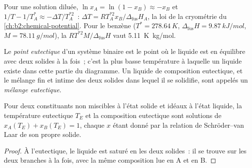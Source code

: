 Pour une solution diluée, $\ln x_A = \ln(1 - x_B) \approx -x_B$ et $1/T -
1/T_A^* \approx -\Delta T/T_A^{*2}$~: $\Delta T = RT_A^{*2}x_B/\Delta_{\text{fus}}H_A$,
la loi de la cryométrie du \cref{ch:b2:chemical-potential}. Pour le benzène ($T^* =
\qty{278.64}{K}$, $\Delta_{\text{fus}}H = \qty{9.87}{kJ/mol}$, $M =
\qty{78.11}{g/mol}$), la  $RT^{*2}M/\Delta_{\text{fus}}H$
vaut \qty{5.11}{K.kg/mol}.

\begin{definition}[Eutectique]\label{def:b2:solid-liquid-diagrams:eutectic}
Le \emph{point eutectique} d'un système binaire est le
point où le liquide est en équilibre avec deux solides à la fois~; c'est la
plus basse température à laquelle un liquide existe dans cette partie du diagramme. Un
liquide de composition eutectique, et le mélange fin et intime des deux
solides dans lequel il se solidifie, sont appelés un \emph{mélange
eutectique}.
\end{definition}

\begin{corollary}\label{cor:b2:solid-liquid-diagrams:eutectic}
Pour deux constituants non miscibles à l'état solide et idéaux à l'état liquide, la
température eutectique $T_E$ et la composition eutectique sont solutions de
$x_A(T_E) + x_B(T_E) = 1$, chaque $x$ étant donné par la relation de Schröder--van Laar
de son propre solide.
\end{corollary}

\begin{proof}
À l'eutectique, le liquide est saturé en les deux solides~: il se trouve sur les deux
branches à la fois, avec la même composition lue en A et en B.
\end{proof}

